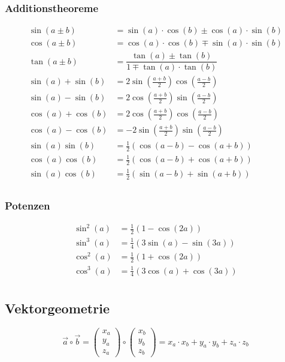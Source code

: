 \subsubsection{Additionstheoreme}
\begin{align*}
	\sin(a \pm b)&=\sin(a) \cdot \cos(b) \pm \cos(a) \cdot \sin(b)\\
	\cos(a \pm b)&=\cos(a) \cdot \cos(b) \mp \sin(a) \cdot \sin(b)\\	
	\tan(a \pm b)&=\dfrac{\tan(a) \pm \tan(b)}{1 \mp \tan(a) \cdot \tan(b)}\\
	\sin(a)+\sin(b) &= 2\sin\left(\frac{a + b}{2}\right)\cos\left(\frac{a - b}{2}\right)\\
	\sin(a)-\sin(b) &= 2\cos\left(\frac{a + b}{2}\right)\sin\left(\frac{a - b}{2}\right)\\
	\cos(a)+\cos(b) &= 2\cos\left(\frac{a + b}{2}\right)\cos\left(\frac{a - b}{2}\right)\\
	\cos(a)-\cos(b) &= -2\sin\left(\frac{a + b}{2}\right)\sin\left(\frac{a - b}{2}\right)\\
	\sin(a)\sin(b)&=\frac{1}{2}(\cos(a-b)-\cos(a+b))\\
	\cos(a)\cos(b)&=\frac{1}{2}(\cos(a-b)+\cos(a+b))\\
	\sin(a)\cos(b)&=\frac{1}{2}(\sin(a-b)+\sin(a+b))\\
\end{align*}

\subsubsection{Potenzen}
\begin{align*}
	\sin^2(a) &= \frac{1}{2}(1 - \cos(2a)) \\
	\sin^3(a) &= \frac{1}{4}(3\sin(a) - \sin(3a)) \\
	\cos^2(a) &= \frac{1}{2}(1 + \cos(2a)) \\
	\cos^3(a) &= \frac{1}{4}(3\cos(a) + \cos(3a)) \\
\end{align*}

\subsection{Vektorgeometrie}
\[\vec{a} \circ \vec{b} = \begin{pmatrix} x_a \\ y_a \\ z_a \end{pmatrix} \circ \begin{pmatrix} x_b \\ y_b \\ z_b \end{pmatrix} = x_a \cdot x_b + y_a \cdot y_b + z_a \cdot z_b\]


